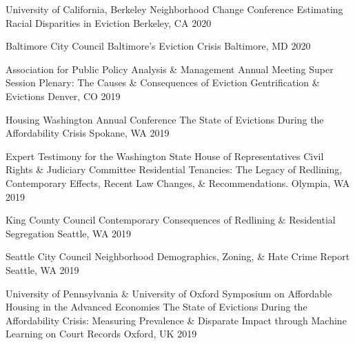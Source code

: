 \begin{cventries}
  \cventry
    {University of California, Berkeley Neighborhood Change Conference} %
    {Estimating Racial Disparities in Eviction} %
    {Berkeley, CA} %
    {2020} %
    {}

  \cventry
    {Baltimore City Council} %
    {Baltimore's Eviction Crisis} %
    {Baltimore, MD} %
    {2020} %
    {}

  \cventry
    {Association for Public Policy Analysis \& Management Annual Meeting Super Session Plenary: The Causes \& Consequences of Eviction} %
    {Gentrification \& Evictions} %
    {Denver, CO} %
    {2019} %
    {}

  \cventry
    {Housing Washington Annual Conference} %
    {The State of Evictions During the Affordability Crisis} %
    {Spokane, WA} %
    {2019} %
    {}

  \cventry
    {Expert Testimony for the Washington State House of Representatives Civil Rights \& Judiciary Committee} %
    {Residential Tenancies: The Legacy of Redlining, Contemporary Effects, Recent Law Changes, \& Recommendations.} %
    {Olympia, WA} %
    {2019} %
    {}

  \cventry
    {King County Council} %
    {Contemporary Consequences of Redlining \& Residential Segregation} %
    {Seattle, WA} %
    {2019} %
    {}

  \cventry
    {Seattle City Council} %
    {Neighborhood Demographics, Zoning, \& Hate Crime Report} %
    {Seattle, WA} %
    {2019} %
    {}

  \cventry
    {University of Pennsylvania \& University of Oxford Symposium on Affordable Housing in the Advanced Economies} %
    {The State of Evictions During the Affordability Crisis: Measuring Prevalence \& Disparate Impact through Machine Learning on Court Records} %
    {Oxford, UK} %
    {2019} %
    {}


\end{cventries}
